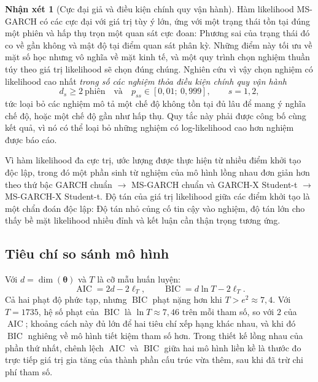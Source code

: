 \documentclass[12pt,a4paper]{article}
\numberwithin{equation}{section}
\theoremstyle{definition}
\newtheorem{remark}{Nhận xét}[section]
\newcommand{\AIC}{\operatorname{AIC}}
\newcommand{\BIC}{\operatorname{BIC}}
\newcommand{\Param}{\symbf{\theta}}
\begin{document}
	\begin{remark}[Cực đại giả và điều kiện chính quy vận hành]\label{rem:spurious}
		Hàm likelihood MS-GARCH có các cực đại với giá trị tùy ý lớn, ứng với một trạng thái tồn
		tại đúng một phiên và hấp thụ trọn một quan sát cực đoan: Phương sai của trạng thái đó co
		về gần không và mật độ tại điểm quan sát phân kỳ. Những điểm này tối ưu về mặt số học
		nhưng vô nghĩa về mặt kinh tế, và một quy trình chọn nghiệm thuần túy theo giá trị
		likelihood sẽ chọn đúng chúng. Nghiên cứu vì vậy chọn nghiệm có likelihood cao nhất
		\emph{trong số các nghiệm thỏa điều kiện chính quy vận hành}
		\begin{equation}
			d_s\ge 2\ \text{phiên}\quad\text{và}\quad p_{ss}\in[0{,}01;\ 0{,}999],
			\qquad s=1,2,
			\label{eq:regularity}
		\end{equation}
		tức loại bỏ các nghiệm mô tả một chế độ không tồn tại đủ lâu để mang ý nghĩa chế độ, hoặc
		một chế độ gần như hấp thụ. Quy tắc này phải được công bố cùng kết quả, vì nó có thể loại
		bỏ những nghiệm có log-likelihood cao hơn nghiệm được báo cáo.
	\end{remark}
	
	Vì hàm likelihood đa cực trị, ước lượng được thực hiện từ nhiều điểm khởi tạo độc lập,
	trong đó một phần sinh từ nghiệm của mô hình lồng nhau đơn giản hơn theo thứ bậc GARCH
	chuẩn $\to$ MS-GARCH chuẩn và GARCH-X Student-t $\to$ MS-GARCH-X Student-t. Độ tán của
	giá trị likelihood giữa các điểm khởi tạo là một chẩn đoán độc lập: Độ tán nhỏ củng cố
	tin cậy vào nghiệm, độ tán lớn cho thấy bề mặt likelihood nhiều đỉnh và kết luận cần thận
	trọng tương ứng.
	
	\subsection{Tiêu chí so sánh mô hình}\label{subsec:ic}
	Với $d=\dim(\Param)$ và $T$ là cỡ mẫu huấn luyện:
	\begin{equation}
		\AIC=2d-2\ell_T,\qquad \BIC=d\ln T-2\ell_T.
		\label{eq:information-criteria}
	\end{equation}
	Cả hai phạt độ phức tạp, nhưng $\BIC$ phạt nặng hơn khi $T>e^{2}\approx 7{,}4$. Với
	$T=1735$, hệ số phạt của $\BIC$ là $\ln T\approx 7{,}46$ trên mỗi tham số, so với $2$ của
	$\AIC$; khoảng cách này đủ lớn để hai tiêu chí xếp hạng khác nhau, và khi đó $\BIC$
	nghiêng về mô hình tiết kiệm tham số hơn. Trong thiết kế lồng nhau của phần thứ nhất,
	chênh lệch $\AIC$ và $\BIC$ giữa hai mô hình liền kề là thước đo trực tiếp giá trị gia
	tăng của thành phần cấu trúc vừa thêm, sau khi đã trừ chi phí tham số.
	
\end{document}
